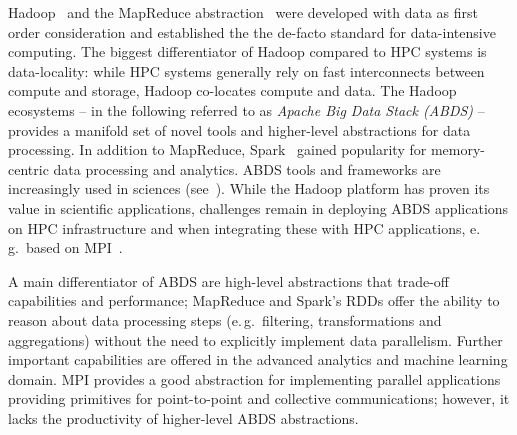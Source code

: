 \documentclass{sig-alternate}
\begin{document}
Hadoop~\cite{hadoop} and the MapReduce abstraction~\cite{mapreduce}
were developed with data as first order consideration and established
the the de-facto standard for data-intensive computing. The biggest
differentiator of Hadoop compared to HPC systems is data-locality:
while HPC systems generally rely on fast interconnects between compute
and storage, Hadoop co-locates compute and data. The Hadoop ecosystems
-- in the following referred to as \emph{Apache Big Data Stack (ABDS)}
-- provides a manifold set of novel tools and higher-level
abstractions for data processing. In addition to MapReduce,
Spark~\cite{Zaharia:2010:SCC:1863103.1863113} gained popularity for
memory-centric data processing and analytics.
ABDS tools and frameworks are increasingly used in sciences
(see~\cite{Dede:2011:REM:2132876.2132888,Massie:EECS-2013-207}). While
the Hadoop platform has proven its value in scientific applications,
challenges remain in deploying ABDS applications on HPC infrastructure
and when integrating these with HPC applications, e.\,g.\ based on
MPI~\cite{doe_hpcor,nrc_future_2017_2020}.

A main differentiator of ABDS are high-level abstractions that trade-off
capabilities and performance; MapReduce and Spark's RDDs offer the ability to
reason about data processing steps (e.\,g.\ filtering, transformations and
aggregations) without the need to explicitly implement data parallelism.
Further important capabilities are offered in the advanced analytics and
machine learning domain. MPI provides a good abstraction for implementing
parallel applications providing primitives for point-to-point and collective
communications; however, it lacks the productivity of higher-level ABDS
abstractions. 
\end{document}
